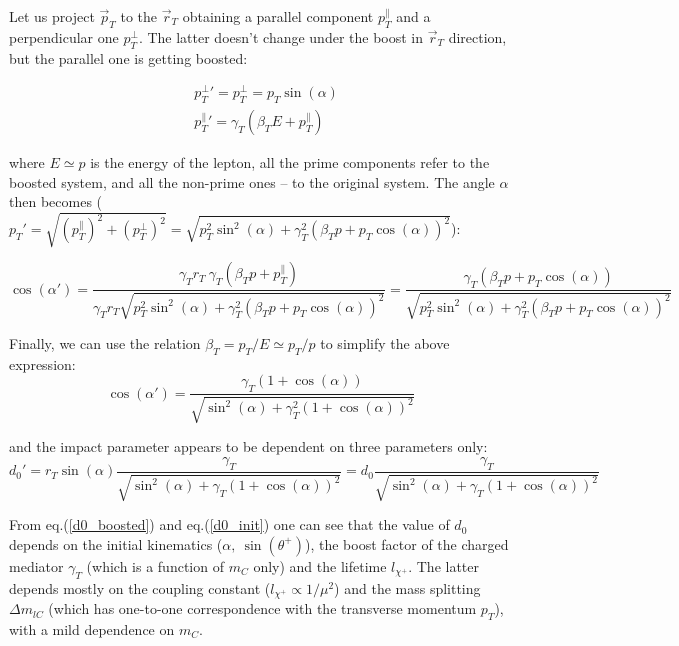 \documentclass[12pt,letterpaper,notitlepage]{article}
\begin{document}
Let us project $\vec{p}_T$ to the $\vec{r}_T$ obtaining a parallel component $p_T^\parallel$ and a perpendicular one $p_T^\bot$. The latter doesn't change under the boost in $\vec{r}_T$ direction, but the parallel one is getting boosted:

\begin{align}
  &p_T^\bot '=p_T^\bot=p_T \sin(\alpha)\\
  &p_T^\parallel '=\gamma_T(\beta_T E+p_T^\parallel)
\end{align}

where $E\simeq p$ is the energy of the lepton, all the prime components refer to the boosted system, and all the non-prime ones -- to the original system. The angle $\alpha$ then becomes ($p_T'=\sqrt{(p_T^\parallel)^2+(p_T^\bot)^2}=\sqrt{p_T^2 \sin^2(\alpha)+\gamma_T^2(\beta_T p+p_T \cos(\alpha))^2}$):

\begin{equation}
  \cos(\alpha')=\frac{\gamma_T r_T\ \gamma_T(\beta_T p+p_T^\parallel)}{\gamma_T r_T \sqrt{p_T^2 \sin^2(\alpha)+\gamma_T^2(\beta_T p+p_T \cos(\alpha))^2}}=\frac{\gamma_T(\beta_T p+p_T \cos(\alpha))}{\sqrt{p_T^2 \sin^2(\alpha)+\gamma_T^2(\beta_T p+p_T \cos(\alpha))^2}}
\end{equation}

Finally, we can use the relation $\beta_T=p_T/E\simeq p_T/p$ to simplify the above expression:
\begin{equation} \label{alpha_boosted}
  \cos(\alpha')=\frac{\gamma_T(1+\cos(\alpha))}{\sqrt{\sin^2(\alpha)+\gamma_T^2(1+ \cos(\alpha))^2}}
\end{equation}

and the impact parameter appears to be dependent on three parameters only:
\begin{equation}\label{d0_boosted}
  d_0'=r_T \sin(\alpha) \frac{\gamma_T}{\sqrt{\sin^2(\alpha)+\gamma_T(1+\cos(\alpha))^2}}= d_0 \frac{\gamma_T}{\sqrt{\sin^2(\alpha)+\gamma_T(1+\cos(\alpha))^2}}
\end{equation}

From eq.(\ref{d0_boosted}) and eq.(\ref{d0_init}) one can see that the value of $d_0$ depends on the initial kinematics ($\alpha,\ \sin(\theta^+)$), the boost factor of the charged mediator $\gamma_T$ (which is a function of $m_C$ only) and the lifetime $l_{\chi^+}$. The latter depends mostly on the coupling constant ($l_{\chi^+} \propto 1/\mu^2$) and the mass splitting $\Delta m_{lC}$ (which has one-to-one correspondence with the transverse momentum $p_T$), with a mild dependence on $m_C$.
\end{document}
